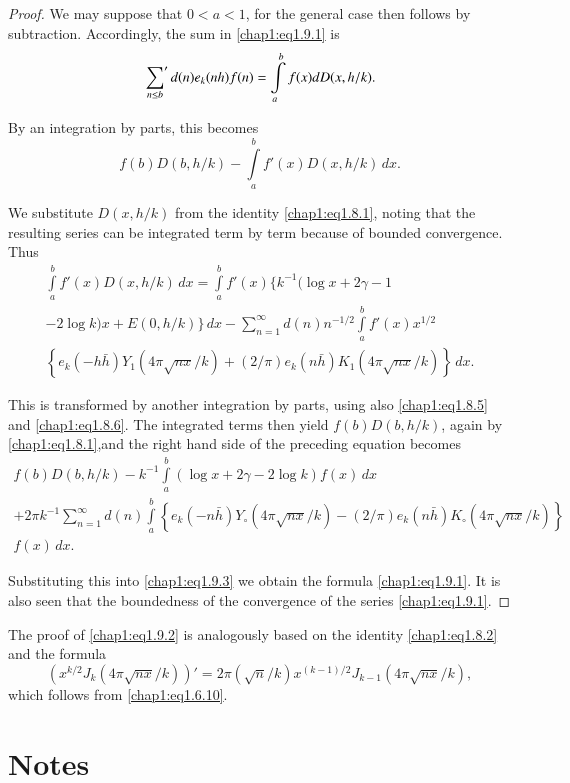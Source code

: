 \begin{proof}
We may suppose that $0<a< 1$, for the general case then follows by
subtraction. Accordingly, the sum in \eqref{chap1:eq1.9.1} is 
$$
\sideset{}{'}\sum\limits_{n\leq b}d(n)e_k(nh)f(n)=\int\limits_a^b
f(x)dD(x,h/k).
$$

By an integration by parts, this becomes
\begin{equation}\label{chap1:eq1.9.3}
f(b)D(b,h/k)-\int\limits_a^bf'(x)D(x,h/k)\,dx.
\end{equation}

We substitute $D(x,h/k)$ from the identity \eqref{chap1:eq1.8.1},
noting that the resulting series can be integrated term by term
because of bounded convergence. Thus
\begin{multline*}
\int\limits_a^bf'(x)D(x,h/k)\,dx=\int\limits_a^bf'(x)
\Big\{k^{-1}(\log x+2\gamma-1\\
-2 \log k)x+E(0,h/k)\Big\}\,dx -\sum\limits_{n=1}^\infty
d(n)n^{-1/2}\int\limits_a^bf'(x)x^{1/2}\\ 
\left\{e_k(-h\bar{h})Y_1(4\pi\sqrt{nx}/k)+(2/\pi)e_k(n\bar{h})K_1
(4\pi\sqrt{nx}/k)\right\}\,dx. 
\end{multline*}

This is transformed by another integration by parts, using also\break
\eqref{chap1:eq1.8.5} and \eqref{chap1:eq1.8.6}. The integrated terms
then yield $f(b)D(b,h/k)$, again by
\eqref{chap1:eq1.8.1},\pageoriginale and the right hand side of the
preceding equation becomes
\begin{multline*}
f(b)D(b,h/k)-k^{-1}\int\limits_a^b(\log x+2\gamma-2 \log k)f(x)\,dx\\
+2\pi k^{-1}\sum\limits_{n=1}^\infty d(n)\int\limits_a^b
\left\{e_k(-n\bar{h})Y_\circ(4\pi\sqrt{nx}/k)-(2/\pi)e_k(n\bar{h})
K_\circ(4\pi\sqrt{nx}/k)\right\}\\
f(x)\,dx.
\end{multline*}

Substituting this into \eqref{chap1:eq1.9.3} we obtain the formula
\eqref{chap1:eq1.9.1}. It is also seen that the boundedness of the
convergence of the series \eqref{chap1:eq1.9.1}.
\end{proof}
The proof of \eqref{chap1:eq1.9.2} is analogously based on the
identity \eqref{chap1:eq1.8.2} and the formula
$$
(x^{k/2}J_k(4\pi\sqrt{nx}/k))'=2\pi(\sqrt{n}/k)x^{(k-1)/2}
J_{k-1}(4\pi\sqrt{nx}/k),
$$
which follows from \eqref{chap1:eq1.6.10}.

\bigskip

\section*{Notes} 

